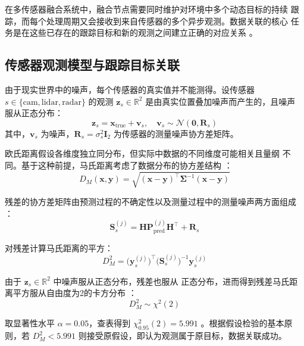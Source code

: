 \documentclass[12pt,a4paper]{ctexart}
\begin{document}
在多传感器融合系统中，融合节点需要同时维护对环境中多个动态目标的持续
跟踪，而每个处理周期又会接收到来自传感器的多个异步观测。数据关联的核心
任务是在这些已存在的跟踪目标和新的观测之间建立正确的对应关系
\cite{li1996nn}。

\subsection{传感器观测模型与跟踪目标关联}

由于现实世界中的噪声，每个传感器的真实值并不能测得。设传感器
$s \in \{\mathrm{cam}, \mathrm{lidar}, \mathrm{radar}\}$ 的观测
$\mathbf{z}_s \in \mathbb{R}^2$ 是由真实位置叠加噪声而产生的，且噪声
服从正态分布\cite{kalman1960,bar2001estimation}：
\begin{equation}
\mathbf{z}_s = \mathbf{x}_{\mathrm{true}} + \mathbf{v}_s, \quad
\mathbf{v}_s \sim \mathcal{N}(\mathbf{0}, \mathbf{R}_s)
\end{equation}
其中，$\mathbf{v}_s$ 为噪声，$\mathbf{R}_s = \sigma_s^2 \mathbf{I}_2$
为传感器的测量噪声协方差矩阵。

欧氏距离假设各维度独立同分布，但实际中数据的不同维度可能相关且量纲
不同。基于这种前提，马氏距离考虑了数据分布的协方差结构
\cite{mahalanobis1936}：
\begin{equation}
D_M(\mathbf{x},\mathbf{y}) =
\sqrt{(\mathbf{x} - \mathbf{y})^{\top}
\mathbf{\Sigma}^{-1}(\mathbf{x} - \mathbf{y})}
\end{equation}

残差的协方差矩阵由预测过程的不确定性以及测量过程中的测量噪声两方面组成
\cite{kalman1960}：
\begin{equation}
\mathbf{S}_s^{(j)} =
\mathbf{H}\mathbf{P}_{\mathrm{pred}}^{(j)}\mathbf{H}^{\top} +
\mathbf{R}_s
\end{equation}

对残差计算马氏距离的平方：
\begin{equation}
D_M^2 =
\bigl( \mathbf{y}_s^{(j)} \bigr)^{\top}
\bigl( \mathbf{S}_s^{(j)} \bigr)^{-1}
\mathbf{y}_s^{(j)}
\end{equation}

由于 $\mathbf{z}_s \in \mathbb{R}^2$ 中噪声服从正态分布，残差也服从
正态分布，进而得到残差马氏距离平方服从自由度为2的卡方分布
\cite{casella2002statistical}：
\begin{equation}
D_M^2 \sim \chi^2(2)
\end{equation}

取显著性水平 $\alpha = 0.05$，查表得到 $\chi_{0.95}^2(2) = 5.991$
\cite{casella2002statistical}。根据假设检验的基本原则，若
$D_M^2 < 5.991$ 则接受原假设，即认为观测属于原目标，数据关联成功。
\end{document}
